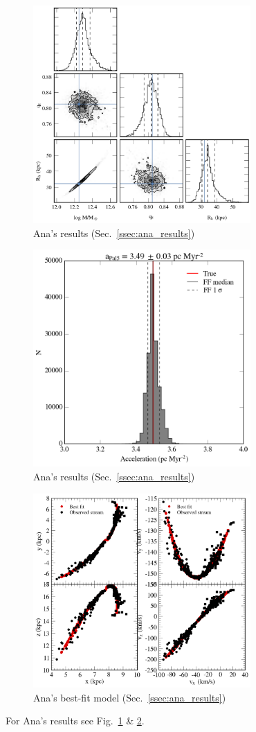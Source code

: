 \begin{figure}
\includegraphics[width=83mm]{./figures/ana_results.png}
  \caption{Ana's results (Sec.~\ref{ssec:ana_results})}
  \label{plot_ana_results}
\end{figure}

\begin{figure}
\includegraphics[width=83mm]{./figures/ana_acc.png}
  \caption{Ana's results (Sec.~\ref{ssec:ana_results})}
  \label{plot_ana_acc}
\end{figure}

\begin{figure}
\includegraphics[width=83mm]{./figures/ana_model.png}
  \caption{Ana's best-fit model (Sec.~\ref{ssec:ana_results})}
  \label{plot_ana_model}
\end{figure}

For Ana's results see Fig.~\ref{plot_ana_results} \& \ref{plot_ana_acc}.

